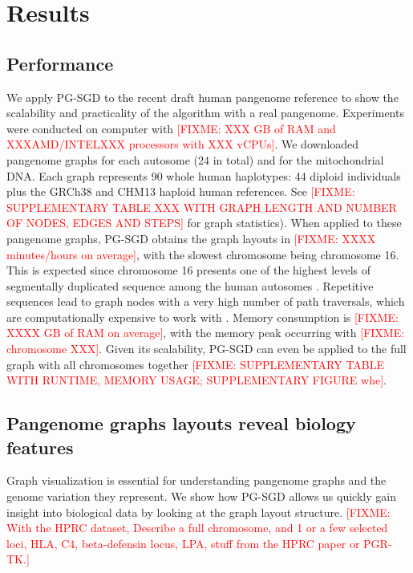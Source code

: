 \documentclass{bioinfo}
\theoremstyle{definition}
\newcommand{\red}[1]{{\textcolor{Red}{#1}}}
\newcommand{\FIXME}[1]{\red{[FIXME: #1]}}
\begin{document}
    \iffalse
    Fig. 1: Describe how our approach works, especially a single update operation (Fig. \ref{fig:sketches}). Explanation of 1D graph updating in Figures \ref{fig:1d_before_update}-\ref{fig:1d_after_update}. Explanation of 2D graph updating in Figures \ref{fig:2d_before_update}-\ref{fig:2d_after_update}. Zipfian distribution.

    
    \fi

    \section{Results}
    \label{sec:results}

    \subsection{Performance}
	We apply PG-SGD to the recent draft human pangenome reference \citep{Liao2023} to show the scalability and practicality of the algorithm with a real pangenome.
	Experiments were conducted on computer with \FIXME{XXX GB of RAM and XXXAMD/INTELXXX processors with XXX vCPUs}.
	We downloaded pangenome graphs for each autosome (24 in total) and for the mitochondrial DNA.
	Each graph represents 90 whole human haplotypes: 44 diploid individuals plus the GRCh38 \citep{Schneider2017} and CHM13 \citep{Nurk_2021} haploid human references.
	See \FIXME{SUPPLEMENTARY TABLE XXX WITH GRAPH LENGTH AND NUMBER OF NODES, EDGES AND STEPS} for graph statistics).
	When applied to these pangenome graphs, PG-SGD obtains the graph layouts in \FIXME{XXXX minutes/hours on average}, with the slowest chromosome being chromosome 16.
	This is expected since chromosome 16 presents one of the highest levels of segmentally duplicated sequence among the human autosomes \citep{Martin2004}.
	Repetitive sequences lead to graph nodes with a very high number of path traversals, which are computationally expensive to work with \citep{Guarracino2022}.
	Memory consumption is \FIXME{XXXX GB of RAM on average}, with the memory peak occurring with \FIXME{chromosome XXX}.
	Given its scalability, PG-SGD can even be applied to the full graph with all chromosomes together \FIXME{SUPPLEMENTARY TABLE WITH RUNTIME, MEMORY USAGE; SUPPLEMENTARY FIGURE whe}.

    \subsection{Pangenome graphs layouts reveal biology features}
	Graph visualization is essential for understanding pangenome graphs and the genome variation they represent.
	We show how PG-SGD allows us quickly gain insight into biological data by looking at the graph layout structure.
	\FIXME{With the HPRC dataset, Describe a full chromosome, and 1 or a few selected loci, HLA, C4, beta-defensin locus, LPA, stuff from the HPRC paper or PGR-TK.}
\end{document}
